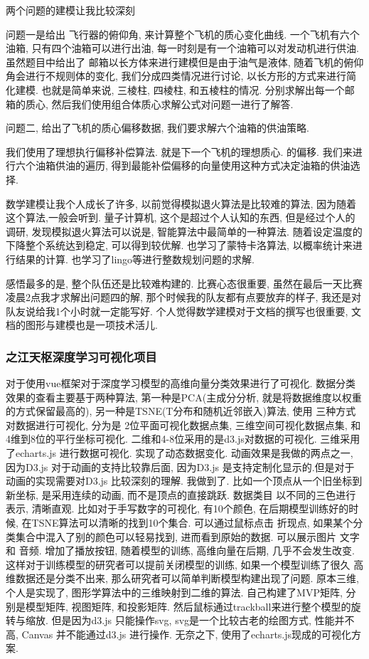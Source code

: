 两个问题的建模让我比较深刻\par
问题一是给出 飞行器的俯仰角, 来计算整个飞机的质心变化曲线. 一个飞机有六个油箱, 只有四个油箱可以进行出油, 每一时刻是有一个油箱可以对发动机进行供油. 虽然题目中给出了 邮箱以长方体来进行建模但是由于油气是液体, 随着飞机的俯仰角会进行不规则体的变化, 我们分成四类情况进行讨论, 以长方形的方式来进行简化建模.  也就是简单来说, 三棱柱, 四棱柱, 和五棱柱的情况.  分别求解出每一个邮箱的质心, 然后我们使用组合体质心求解公式对问题一进行了解答. \par
问题二, 给出了飞机的质心偏移数据, 我们要求解六个油箱的供油策略. \par
我们使用了理想执行偏移补偿算法. 就是下一个飞机的理想质心. 的偏移. 我们来进行六个油箱供油的遍历, 得到最能补偿偏移的向量使用这种方式决定油箱的供油选择. \par
数学建模让我个人成长了许多, 以前觉得模拟退火算法是比较难的算法, 因为随着这个算法,一般会听到. 量子计算机, 这个是超过个人认知的东西, 但是经过个人的调研, 发现模拟退火算法可以说是, 智能算法中最简单的一种算法. 随着设定温度的下降整个系统达到稳定, 可以得到较优解. 也学习了蒙特卡洛算法, 以概率统计来进行结果的计算. 也学习了lingo等进行整数规划问题的求解.\par
感悟最多的是, 整个队伍还是比较难构建的. 比赛心态很重要, 虽然在最后一天比赛凌晨2点我才求解出问题四的解, 那个时候我的队友都有点要放弃的样子, 我还是对队友说给我1个小时就一定能写好. 个人觉得数学建模对于文档的撰写也很重要, 文档的图形与建模也是一项技术活儿.\par
\subsubsection{之江天枢深度学习可视化项目}
对于使用vue框架对于深度学习模型的高维向量分类效果进行了可视化. 数据分类效果的查看主要基于两种算法, 第一种是PCA(主成分分析, 就是将数据维度以权重的方式保留最高的), 另一种是TSNE(T分布和随机近邻嵌入)算法,  使用 三种方式对数据进行可视化, 分为是 2位平面可视化数据点集, 三维空间可视化数据点集, 和 4维到8位的平行坐标可视化. 二维和4-8位采用的是d3.js对数据的可视化. 三维采用了echarts.js 进行数据可视化. 实现了动态数据变化. 动画效果是我做的两点之一, 因为D3.js 对于动画的支持比较靠后面, 因为D3.js 是支持定制化显示的.但是对于动画的实现需要对D3.js 比较深刻的理解. 我做到了. 比如一个顶点从一个旧坐标到新坐标, 是采用连续的动画, 而不是顶点的直接跳跃. 数据类目 以不同的三色进行表示, 清晰直观. 比如对于手写数字的可视化, 有10个颜色, 在后期模型训练好的时候, 在TSNE算法可以清晰的找到10个集合. 可以通过鼠标点击 折现点, 如果某个分类集合中混入了别的颜色可以轻易找到, 进而看到原始的数据. 可以展示图片 文字 和 音频.  增加了播放按钮, 随着模型的训练, 高维向量在后期, 几乎不会发生改变. 这样对于训练模型的研究者可以提前关闭模型的训练, 如果一个模型训练了很久 高维数据还是分类不出来, 那么研究者可以简单判断模型构建出现了问题.
原本三维,个人是实现了, 图形学算法中的三维映射到二维的算法. 自己构建了MVP矩阵, 分别是模型矩阵, 视图矩阵, 和投影矩阵. 然后鼠标通过trackball来进行整个模型的旋转与缩放. 但是因为d3.js 只能操作svg, svg是一个比较古老的绘图方式, 性能并不高, Canvas 并不能通过d3.js 进行操作. 无奈之下, 使用了echarts.js现成的可视化方案.

